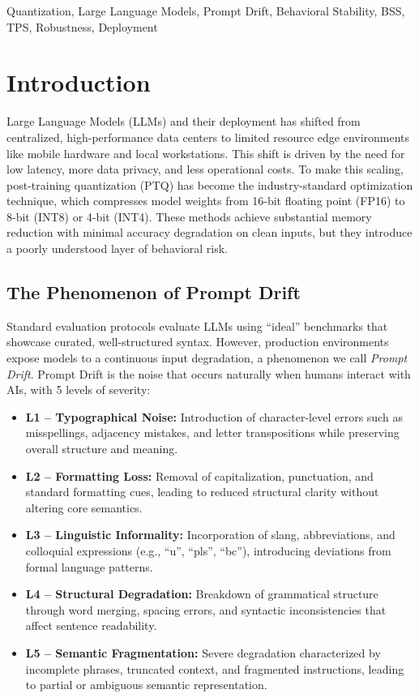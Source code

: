\documentclass[conference]{IEEEtran}
\begin{document}
\begin{IEEEkeywords}
Quantization, Large Language Models, Prompt Drift, Behavioral Stability, BSS, TPS, Robustness, Deployment
\end{IEEEkeywords}

\section{Introduction}

Large Language Models (LLMs) and their deployment has shifted from centralized, high-performance data centers to limited resource edge environments like mobile hardware and local workstations. This shift is driven by the need for low latency, more data privacy, and less operational costs. To make this scaling, post-training quantization (PTQ) has become the industry-standard optimization technique, which compresses model weights from 16-bit floating point (FP16) to 8-bit (INT8) or 4-bit (INT4). These methods achieve substantial memory reduction with minimal accuracy degradation on clean inputs, but they introduce a poorly understood layer of behavioral risk.

\subsection{The Phenomenon of Prompt Drift}

Standard evaluation protocols evaluate LLMs using ``ideal'' benchmarks that showcase curated, well-structured syntax. However, production environments expose models to a continuous input degradation, a phenomenon we call \textit{Prompt Drift}. Prompt Drift is the noise that occurs naturally when humans interact with AIs, with 5 levels of severity:

\begin{itemize}
\item \textbf{L1 – Typographical Noise:} Introduction of character-level errors such as misspellings, adjacency mistakes, and letter transpositions while preserving overall structure and meaning.
\item \textbf{L2 – Formatting Loss:} Removal of capitalization, punctuation, and standard formatting cues, leading to reduced structural clarity without altering core semantics.
\item \textbf{L3 – Linguistic Informality:} Incorporation of slang, abbreviations, and colloquial expressions (e.g., ``u'', ``pls'', ``bc''), introducing deviations from formal language patterns.
\item \textbf{L4 – Structural Degradation:} Breakdown of grammatical structure through word merging, spacing errors, and syntactic inconsistencies that affect sentence readability.
\item \textbf{L5 – Semantic Fragmentation:} Severe degradation characterized by incomplete phrases, truncated context, and fragmented instructions, leading to partial or ambiguous semantic representation.
\end{itemize}
\end{document}
